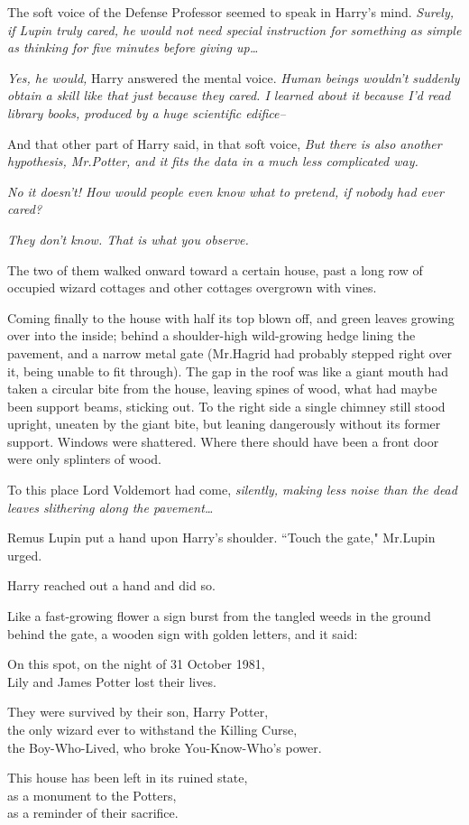 The soft voice of the Defense Professor seemed to speak in Harry's mind. \emph{Surely, if Lupin truly cared, he would not need special instruction for something as simple as thinking for five minutes before giving up{\ldots}}

\emph{Yes, he would,} Harry answered the mental voice. \emph{Human beings wouldn't suddenly obtain a skill like that just because they cared. I learned about it because I'd read library books, produced by a huge scientific edifice\---}

And that other part of Harry said, in that soft voice, \emph{But there is also another hypothesis, Mr.\?Potter, and it fits the data in a much less complicated way.}

\emph{No it doesn't! How would people even know what to pretend, if nobody had ever cared?}

\emph{They don't know. That is what you observe.}

The two of them walked onward toward a certain house, past a long row of occupied wizard cottages and other cottages overgrown with vines.

Coming finally to the house with half its top blown off, and green leaves growing over into the inside; behind a shoulder-high wild-growing hedge lining the pavement, and a narrow metal gate (Mr.\?Hagrid had probably stepped right over it, being unable to fit through). The gap in the roof was like a giant mouth had taken a circular bite from the house, leaving spines of wood, what had maybe been support beams, sticking out. To the right side a single chimney still stood upright, uneaten by the giant bite, but leaning dangerously without its former support. Windows were shattered. Where there should have been a front door were only splinters of wood.

To this place Lord Voldemort had come, \emph{silently, making less noise than the dead leaves slithering along the pavement{\ldots}}

Remus Lupin put a hand upon Harry's shoulder. ``Touch the gate," Mr.\?Lupin urged.

Harry reached out a hand and did so.

Like a fast-growing flower a sign burst from the tangled weeds in the ground behind the gate, a wooden sign with golden letters, and it said:

\begin{center}
On this spot, on the night of 31 October 1981,\\
Lily and James Potter lost their lives.

They were survived by their son, Harry Potter,\\
the only wizard ever to withstand the Killing Curse,\\
the Boy-Who-Lived, who broke You-Know-Who's power.

This house has been left in its ruined state,\\
as a monument to the Potters,\\
as a reminder of their sacrifice.
\end{center}

